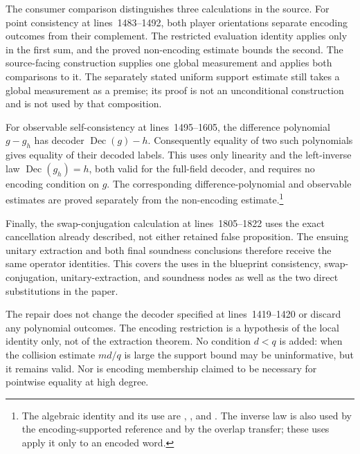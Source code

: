\documentclass[11pt]{article}
\begin{document}
The consumer comparison distinguishes three calculations in the source.
For point consistency at lines~1483--1492, both player orientations separate
encoding outcomes from their complement.  The restricted evaluation identity
applies only in the first sum, and the proved non-encoding estimate bounds the
second.  The source-facing construction supplies one global measurement and
applies both comparisons to it.  The separately stated uniform support estimate
still takes a global measurement as a premise; its proof is not an
unconditional construction and is not used by that composition.

For observable self-consistency at lines~1495--1605, the difference polynomial
$g-g_h$ has decoder $\operatorname{Dec}(g)-h$.  Consequently equality of two
such polynomials gives equality of their decoded labels.  This uses only
linearity and the left-inverse law $\operatorname{Dec}(g_h)=h$, both valid for
the full-field decoder, and requires no encoding condition on $g$.
The corresponding difference-polynomial and observable estimates are proved
separately from the non-encoding estimate.\footnote{The algebraic identity and
its use are ,
, and
.  The inverse law is also
used by the encoding-supported reference and by the overlap transfer; these
uses apply it only to an encoded word.}

Finally, the swap-conjugation calculation at lines~1805--1822 uses the exact
cancellation already described, not either retained false proposition.
The ensuing unitary extraction and both final soundness conclusions therefore
receive the same operator identities.  This covers the uses in the blueprint
consistency, swap-conjugation, unitary-extraction, and soundness nodes as well
as the two direct substitutions in the paper.

The repair does not change the decoder specified at lines~1419--1420 or discard
any polynomial outcomes.  The encoding restriction is a hypothesis of the
local identity only, not of the extraction theorem.  No condition $d<q$ is
added: when the collision estimate $md/q$ is large the support bound may be
uninformative, but it remains valid.  Nor is encoding membership claimed to be
necessary for pointwise equality at high degree.
\end{document}
